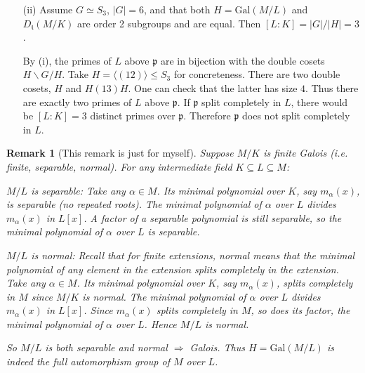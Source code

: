 \documentclass[12pt]{article}  %
\newtheorem{remark}[theorem]{Remark}
\begin{document}
\begin{solution}
\begin{enumerate}
              Therefore $\overline\Phi$ is a bijection:
              \[H\backslash G / D_{\mathfrak{t}}\ \xrightarrow{\ \sim\ }\ \{\text{primes of }L\text{ above }\mathfrak{p}\}.\]
        \item[(ii)] Assume $G\simeq S_3$, $|G|=6$, and that both $H=\mathrm{Gal}(M/L)$ and $D_{\mathfrak t}(M/K)$ are order 2 subgroups and are equal. Then $[L:K]=|G|/|H|=3$.

              By (i), the primes of $L$ above $\mathfrak{p}$ are in bijection with the double cosets $H\backslash G / H$. Take $H=\langle (12)\rangle\le S_3$ for concreteness. There are two double cosets, $H$ and $H(13)H$. One can check that the latter has size $4$. Thus there are exactly two primes of $L$ above $\mathfrak{p}$. If $\mathfrak{p}$ split completely in $L$, there would be $[L:K]=3$ distinct primes over $\mathfrak{p}$. Therefore $\mathfrak{p}$ does not split completely in $L$.
    \end{enumerate}

    \begin{remark}[This remark is just for myself]
        Suppose $M/K$ is finite Galois (i.e. finite, separable, normal). For any intermediate field $K\subseteq L\subseteq M$:

        $M/L$ is separable: Take any $\alpha \in M$. Its minimal polynomial over $K$, say $m_\alpha(x)$, is separable (no repeated roots). The minimal polynomial of $\alpha$ over $L$ divides $m_\alpha(x)$ in $L[x]$. A factor of a separable polynomial is still separable, so the minimal polynomial of $\alpha$ over $L$ is separable.

        $M/L$ is normal: Recall that for finite extensions, normal means that the minimal polynomial of any element in the extension splits completely in the extension. Take any $\alpha \in M$. Its minimal polynomial over $K$, say $m_\alpha(x)$, splits completely in $M$ since $M/K$ is normal. The minimal polynomial of $\alpha$ over $L$ divides $m_\alpha(x)$ in $L[x]$. Since $m_\alpha(x)$ splits completely in $M$, so does its factor, the minimal polynomial of $\alpha$ over $L$. Hence $M/L$ is normal.

        So $M/L$ is both separable and normal $\Rightarrow$ Galois. Thus $H=\mathrm{Gal}(M/L)$ is indeed the full automorphism group of $M$ over $L$.
    \end{remark}
\end{solution}

\bigskip
\end{document}
